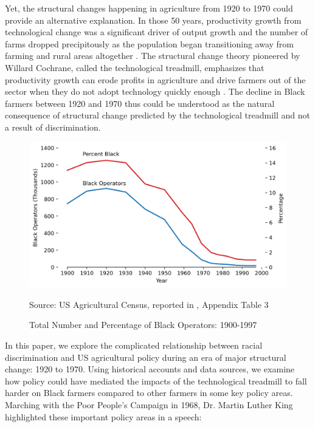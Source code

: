 \documentclass[12pt]{article}
\begin{document}
Yet, the structural changes happening in agriculture from 1920 to 1970 could provide an alternative explanation.
In those 50 years, productivity growth from technological change was a significant driver of output growth and the number of farms dropped precipitously as the population began transitioning away from farming and rural areas altogether \citep{dimitri_20th_2005,mundlak_economic_2005}.
The structural change theory pioneered by Willard Cochrane, called the technological treadmill, emphasizes that productivity growth can erode profits in agriculture and drive farmers out of the sector when they do not adopt technology quickly enough \citep{cochrane_farm_1958,levins_treadmill_1996}.
The decline in Black farmers between 1920 and 1970 thus could be understood as the natural consequence of structural change predicted by the technological treadmill and not a result of discrimination.



\begin{figure}[ht!]
\caption{Total Number and Percentage of Black Operators: 1900-1997}
\label{operators}
\centering
    \includegraphics[width=.9\textwidth]{figs/Figure1.png}
    
Source: US Agricultural Census, reported in \citet{reynolds_black_2002}, Appendix Table 3

\end{figure}


In this paper, we explore the complicated relationship between racial discrimination and US agricultural policy during an era of major structural change: 1920 to 1970. 
Using historical accounts and data sources, we examine how policy could have mediated the impacts of the technological treadmill to fall harder on Black farmers compared to other farmers in some key policy areas.
Marching with the Poor People’s Campaign in 1968, Dr. Martin Luther King highlighted these important policy areas in a speech: 
\end{document}
